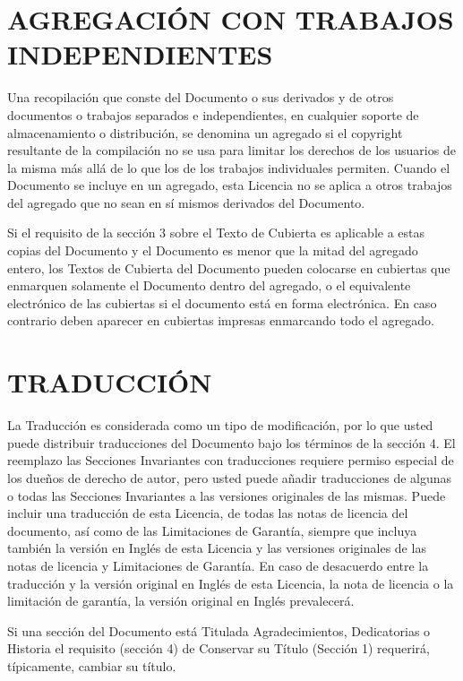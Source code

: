 \documentclass[letterpaper,12pt,titlepage]{article}
\begin{document}
\section{AGREGACIÓN CON TRABAJOS INDEPENDIENTES}

Una recopilación que conste del Documento o sus derivados y de otros documentos o trabajos separados e independientes, en cualquier soporte de almacenamiento o distribución, se denomina un agregado si el copyright resultante de la compilación no se usa para limitar los derechos de los usuarios de la misma más allá de lo que los de los trabajos individuales permiten. Cuando el Documento se incluye en un agregado, esta Licencia no se aplica a otros trabajos del agregado que no sean en sí mismos derivados del Documento.\par

Si el requisito de la sección 3 sobre el Texto de Cubierta es aplicable a estas copias del Documento y el Documento es menor que la mitad del agregado entero, los Textos de Cubierta del Documento pueden colocarse en cubiertas que enmarquen solamente el Documento dentro del agregado, o el equivalente electrónico de las cubiertas si el documento está en forma electrónica. En caso contrario deben aparecer en cubiertas impresas enmarcando todo el agregado.\par

\section{TRADUCCIÓN}

La Traducción es considerada como un tipo de modificación, por lo que usted puede distribuir traducciones del Documento bajo los términos de la sección 4. El reemplazo las Secciones Invariantes con traducciones requiere permiso especial de los dueños de derecho de autor, pero usted puede añadir traducciones de algunas o todas las Secciones Invariantes a las versiones originales de las mismas. Puede incluir una traducción de esta Licencia, de todas las notas de licencia del documento, así como de las Limitaciones de Garantía, siempre que incluya también la versión en Inglés de esta Licencia y las versiones originales de las notas de licencia y Limitaciones de Garantía. En caso de desacuerdo entre la traducción y la versión original en Inglés de esta Licencia, la nota de licencia o la limitación de garantía, la versión original en Inglés prevalecerá.\par

Si una sección del Documento está Titulada Agradecimientos, Dedicatorias o Historia el requisito (sección 4) de Conservar su Título (Sección 1) requerirá, típicamente, cambiar su título.\par
\end{document}
